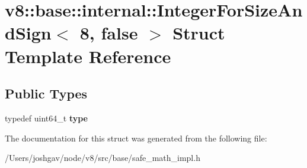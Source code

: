 \hypertarget{structv8_1_1base_1_1internal_1_1_integer_for_size_and_sign_3_018_00_01false_01_4}{}\section{v8\+:\+:base\+:\+:internal\+:\+:Integer\+For\+Size\+And\+Sign$<$ 8, false $>$ Struct Template Reference}
\label{structv8_1_1base_1_1internal_1_1_integer_for_size_and_sign_3_018_00_01false_01_4}
\subsection*{Public Types}
\begin{DoxyCompactItemize}
\item 
typedef uint64\+\_\+t {\bfseries type}\hypertarget{structv8_1_1base_1_1internal_1_1_integer_for_size_and_sign_3_018_00_01false_01_4_a77b62b5b1b5b55212ac1b881d718e4dc}{}\label{structv8_1_1base_1_1internal_1_1_integer_for_size_and_sign_3_018_00_01false_01_4_a77b62b5b1b5b55212ac1b881d718e4dc}

\end{DoxyCompactItemize}


The documentation for this struct was generated from the following file\+:\begin{DoxyCompactItemize}
\item 
/\+Users/joshgav/node/v8/src/base/safe\+\_\+math\+\_\+impl.\+h\end{DoxyCompactItemize}
